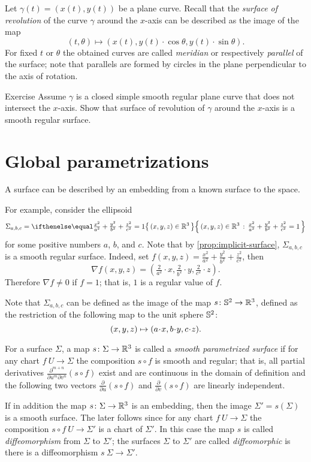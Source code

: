 Let $\gamma(t)=(x(t),y(t))$ be a plane curve.
Recall that the \emph{surface of revolution} of the curve $\gamma$ around the $x$-axis can be described as the 
image of the map 
\[(t,\theta)\mapsto (x(t), y(t)\cdot\cos\theta,y(t)\cdot\sin\theta).\]
For fixed $t$ or $\theta$ the obtained curves are called \emph{meridian} or respectively \emph{parallel} of the surface; note that parallels are formed by circles in the plane perpendicular to the axis of rotation.

\begin{thm}{Exercise}\label{ex:revolution}
Assume $\gamma$ is a closed simple smooth regular plane curve that does not intersect the $x$-axis.
Show that surface of revolution of $\gamma$ around the $x$-axis is a smooth regular surface.
\end{thm}


\section*{Global parametrizations} 
A surface can be described by an embedding from a known surface to the space.

For example, consider the ellipsoid
\[\Sigma_{a,b,c}=\set{(x,y,z)\in\RR^3}{\tfrac{x^2}{a^2}+\tfrac{y^2}{b^2}+\tfrac{z^2}{c^2}=1}\]
for some positive numbers $a$, $b$, and $c$.
Note that by \ref{prop:implicit-surface}, $\Sigma_{a,b,c}$ is a smooth regular surface.
Indeed, set $f(x,y,z)=\tfrac{x^2}{a^2}+\tfrac{y^2}{b^2}+\tfrac{z^2}{c^2}$,
then
\[\nabla f(x,y,z)=(\tfrac{2}{a^2}\cdot x,\tfrac{2}{b^2}\cdot y,\tfrac{2}{c^2}\cdot z).\]
Therefore $\nabla f\ne0$ if $f=1$; that is, $1$ is a regular value of $f$.

Note that $\Sigma_{a,b,c}$ can be defined as the image of the map $s\colon\mathbb{S}^2\to\mathbb{R}^3$, defined as the restriction of the following map to the unit sphere $\mathbb{S}^2$:
\[(x,y,z)\z\mapsto (a\cdot x, b\cdot y,c\cdot z).\]

For a surface $\Sigma$, a map $s\colon \Sigma \to \mathbb{R} ^3$ is called a 
\emph{smooth parametrized surface} if for any chart $f\:U\to \Sigma$ 
the composition $s\circ f$ is smooth and regular;
that is, all partial derivatives $\frac{\partial^{m+n}}{\partial u^m\partial v^n}(s\circ f)$ exist and are continuous in the domain of definition and the following two vectors 
$\frac{\partial}{\partial u}(s\circ f)$ and $\frac{\partial}{\partial v}(s\circ f)$ are linearly independent.

If in addition the map $s\colon \Sigma \to \mathbb{R} ^3$ is an embedding, then the image $\Sigma'=s(\Sigma)$ is a smooth surface.
The later follows since for any chart $f\:U\to \Sigma$ the composition $s\circ f\:U\to \Sigma'$ is a chart of $\Sigma'$. 
In this case the map $s$ is called \emph{diffeomorphism} from $\Sigma$ to $\Sigma'$; the surfaces $\Sigma$ to $\Sigma'$ are called \emph{diffeomorphic} is there is a diffeomorphism $s\:\Sigma\to\Sigma'$.


